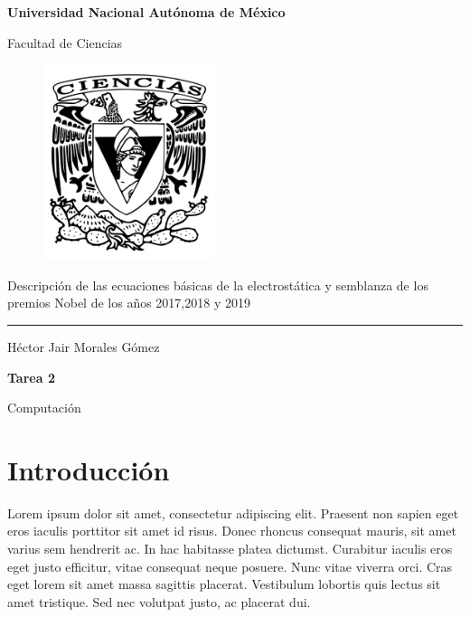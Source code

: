 \documentclass[12pt]{article}
\begin{document}
	

\begin{titlepage}
     \begin{center}
     \bigskip
    
    \textbf{Universidad Nacional Autónoma de México}
    
    \bigskip
    \bigskip
    
    Facultad de Ciencias
    
    \bigskip
    \bigskip
    
    

\begin{figure}[htb]
	\centering
	\includegraphics[width=5cm]{ciencias.png}
	\label{fig:ejemplo1}
\end{figure}



    
    
    \begin{Large}
    
      Descripción de las ecuaciones básicas de la electrostática y semblanza de los premios Nobel de los años 2017,2018 y 2019
      
    \end{Large} 
   
    \rule{100mm}{0.5mm}
   
    \bigskip
    \bigskip
   
   Héctor Jair Morales Gómez 
   
   \bigskip
   \bigskip
   
    \textbf{Tarea 2}

    \bigskip
    Computación
\end{center}
\end{titlepage}


\section{Introducción}

Lorem ipsum dolor sit amet, consectetur adipiscing elit. Praesent non sapien eget eros iaculis porttitor sit amet id risus. Donec rhoncus consequat mauris, sit amet varius sem hendrerit ac. In hac habitasse platea dictumst. Curabitur iaculis eros eget justo efficitur, vitae consequat neque posuere. Nunc vitae viverra orci. Cras eget lorem sit amet massa sagittis placerat. Vestibulum lobortis quis lectus sit amet tristique. Sed nec volutpat justo, ac placerat dui. 
\end{document}
